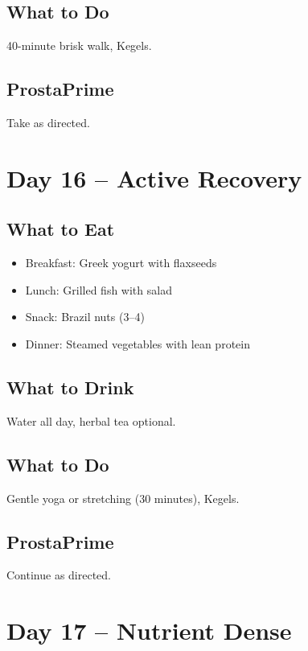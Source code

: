 \documentclass[11pt,oneside]{book}
\begin{document}
\section*{What to Do}
40-minute brisk walk, Kegels.

\section*{ProstaPrime}
Take as directed.

\clearpage


\chapter*{Day 16 – Active Recovery}

\section*{What to Eat}
\begin{itemize}[leftmargin=*]
\item Breakfast: Greek yogurt with flaxseeds
\item Lunch: Grilled fish with salad
\item Snack: Brazil nuts (3--4)
\item Dinner: Steamed vegetables with lean protein
\end{itemize}

\section*{What to Drink}
Water all day, herbal tea optional.

\section*{What to Do}
Gentle yoga or stretching (30 minutes), Kegels.

\section*{ProstaPrime}
Continue as directed.

\clearpage


\chapter*{Day 17 – Nutrient Dense}
\end{document}
